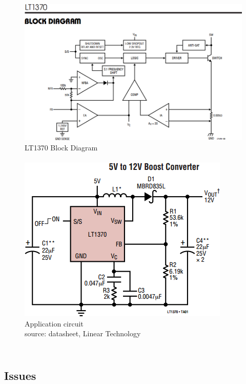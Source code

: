 \documentclass{beamer}
\begin{document}
\begin{frame}
\begin{columns}[t]
\begin{figure}
  \centering
  \includegraphics[width=1.0\columnwidth]{images-dis4/lt1370-block} \\
  LT1370 Block Diagram \\
  \hfill \\
  \includegraphics[width=0.66\columnwidth]{images-dis4/lt1370-application} \\
  Application circuit \\
  \tiny{source: datasheet, Linear Technology}
\end{figure}
\end{columns}
\end{frame}

\subsection{Issues}
\end{document}
